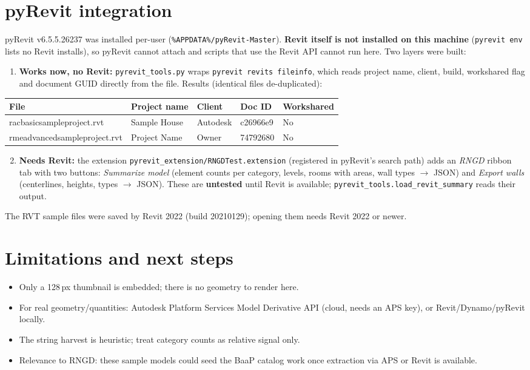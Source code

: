 \documentclass[11pt]{article}
\begin{document}
\section{pyRevit integration}
pyRevit v6.5.5.26237 was installed per-user
(\texttt{\%APPDATA\%/pyRevit-Master}). \textbf{Revit itself is not installed on this machine}
(\texttt{pyrevit env} lists no Revit installs), so pyRevit cannot attach and scripts that use the
Revit API cannot run here. Two layers were built:
\begin{enumerate}
\item \textbf{Works now, no Revit:} \texttt{pyrevit\_tools.py} wraps
\texttt{pyrevit revits fileinfo}, which reads project name, client, build, workshared flag and
document GUID directly from the file. Results (identical files de-duplicated):
\end{enumerate}
\begin{center}\small\begin{tabular}{lllll}\toprule
File & Project name & Client & Doc ID & Workshared \\ \midrule
racbasicsampleproject.rvt & Sample House & Autodesk & c26966e9 & No \\
rmeadvancedsampleproject.rvt & Project Name & Owner & 74792680 & No \\
\bottomrule\end{tabular}\end{center}
\begin{enumerate}\setcounter{enumi}{1}
\item \textbf{Needs Revit:} the extension \texttt{pyrevit\_extension/RNGDTest.extension}
(registered in pyRevit's search path) adds an \emph{RNGD} ribbon tab with two buttons:
\emph{Summarize model} (element counts per category, levels, rooms with areas, wall types $\rightarrow$ JSON)
and \emph{Export walls} (centerlines, heights, types $\rightarrow$ JSON). These are \textbf{untested}
until Revit is available; \texttt{pyrevit\_tools.load\_revit\_summary} reads their output.
\end{enumerate}
The RVT sample files were saved by Revit 2022 (build 20210129); opening them needs Revit 2022 or newer.

\section{Limitations and next steps}
\begin{itemize}
\item Only a 128\,px thumbnail is embedded; there is no geometry to render here.
\item For real geometry/quantities: Autodesk Platform Services Model Derivative API
(cloud, needs an APS key), or Revit/Dynamo/pyRevit locally.
\item The string harvest is heuristic; treat category counts as relative signal only.
\item Relevance to RNGD: these sample models could seed the BaaP catalog work once
extraction via APS or Revit is available.
\end{itemize}
\end{document}
